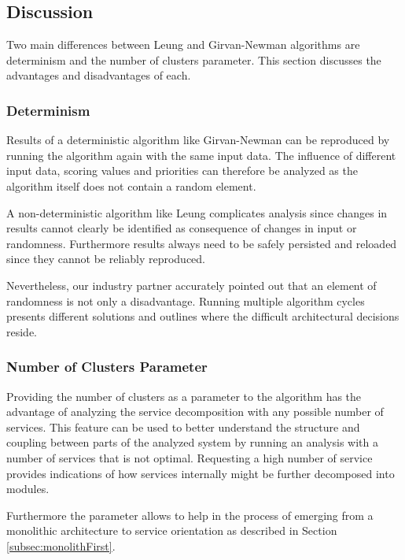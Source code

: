 \subsection{Discussion}
\label{subsec:algoDiscussion}

Two main differences between Leung and Girvan-Newman algorithms are determinism and the number of clusters parameter. This section discusses the advantages and disadvantages of each.

\subsubsection{Determinism}

Results of a deterministic algorithm like Girvan-Newman can be reproduced by running the algorithm again with the same input data. The influence of different input data, scoring values and priorities can therefore be analyzed as the algorithm itself does not contain a random element.

A non-deterministic algorithm like Leung complicates analysis since changes in results cannot clearly be identified as consequence of changes in input or randomness. Furthermore results always need to be safely persisted and reloaded since they cannot be reliably reproduced. 

Nevertheless, our industry partner accurately pointed out that an element of randomness is not only a disadvantage. Running multiple algorithm cycles presents different solutions and outlines where the difficult architectural decisions reside.

\subsubsection{Number of Clusters Parameter}

Providing the number of clusters as a parameter to the algorithm has the advantage of analyzing the service decomposition with any possible number of services. This feature can be used to better understand the structure and coupling between parts of the analyzed system by running an analysis with a number of services that is not optimal. Requesting a high number of service provides indications of how services internally might be further decomposed into modules. 

Furthermore the parameter allows to help in the process of emerging from a monolithic architecture to service orientation as described in Section \ref{subsec:monolithFirst}.

